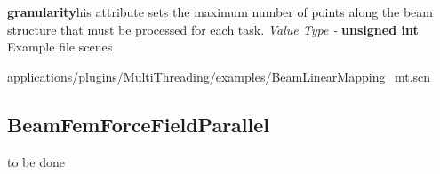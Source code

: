 \documentclass{article}
\newenvironment{componentoption}[2]%
{\textbf{#1}\newline}
\newcommand{\defaultvalue}[1] {\newline \textit{Default Value - } #1}
\newcommand{\valuetype}[1] {\newline \textit{Value Type - } \textbf{#1}}
\begin{document}


\begin{componentoption}{granularity}

This attribute sets the maximum number of points along the beam structure that must be processed for each task.
\valuetype{unsigned int}
\end{componentoption}



\subsubsection{Example file scenes}


applications/plugins/MultiThreading/examples/BeamLinearMapping\_mt.scn\\[\baselineskip]




\subsection{BeamFemForceFieldParallel}

to be done
\end{document}
